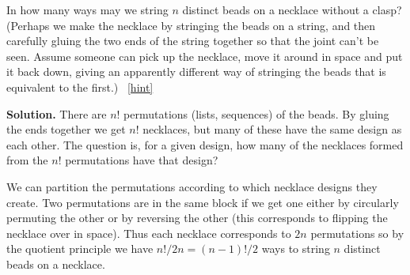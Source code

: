\documentclass{book}
\begin{document}
\setcounter{project}{111}
\addtocounter{project}{-1}
\begin{activity}[]\label{necklace}
\hypertarget{p-806}{}%
In how many ways may we string \(n\) distinct beads on a necklace without a clasp? (Perhaps we make the necklace by stringing the beads on a string, and then carefully gluing the two ends of the string together so that the joint can't be seen. Assume someone can pick up the necklace, move it around in space and put it back down, giving an apparently different way of stringing the beads that is equivalent to the first.)%
~\hfill{\tiny\hyperlink{a-111}{[hint]}\hypertarget{q-111}{}}\par\smallskip%
\noindent\textbf{Solution.}\hypertarget{solution-84}{}\quad%
\hypertarget{p-809}{}%
There are \(n!\) permutations (lists, sequences) of the beads.  By gluing the ends together we get \(n!\) necklaces, but many of these have the same design as each other.  The question is, for a given design, how many of the necklaces formed from the \(n!\) permutations have that design?%
\par
\hypertarget{p-810}{}%
We can partition the permutations according to which necklace designs they create. Two permutations are in the same block if we get one either by circularly permuting the other or by reversing the other (this corresponds to flipping the necklace over in space). Thus each necklace corresponds to \(2n\) permutations so by the quotient principle we have \(n!/2n=(n-1)!/2\) ways to string \(n\) distinct beads on a necklace.%
\end{activity}
\end{document}
